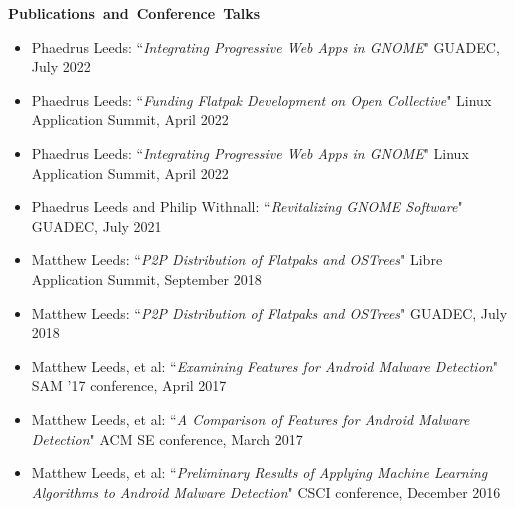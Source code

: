 \documentclass[11pt]{article}
\begin{document}
\newpage

\vspace{0.6em}
\hbox{\large \textbf{Publications and Conference Talks}}

\begin{itemize}[itemindent=0em]
  \item Phaedrus Leeds: ``\textit{Integrating Progressive Web Apps in GNOME}"\newline
        GUADEC, July 2022
  \item Phaedrus Leeds: ``\textit{Funding Flatpak Development on Open Collective}"\newline
        Linux Application Summit, April 2022
  \item Phaedrus Leeds: ``\textit{Integrating Progressive Web Apps in GNOME}"\newline
        Linux Application Summit, April 2022
  \item Phaedrus Leeds and Philip Withnall: ``\textit{Revitalizing GNOME Software}"\newline
        GUADEC, July 2021
  \item Matthew Leeds: ``\textit{P2P Distribution of Flatpaks and OSTrees}"\newline
        Libre Application Summit, September 2018
  \item Matthew Leeds: ``\textit{P2P Distribution of Flatpaks and OSTrees}"\newline
        GUADEC, July 2018
  \item Matthew Leeds, et al: ``\textit{Examining Features for Android Malware Detection}"\newline
        SAM '17 conference, April 2017
  \item Matthew Leeds, et al: ``\textit{A Comparison of Features for Android Malware Detection}"\newline
        ACM SE conference, March 2017
  \item Matthew Leeds, et al: ``\textit{Preliminary Results of Applying Machine Learning Algorithms to Android Malware Detection}"\newline
        CSCI conference, December 2016
\end{itemize}
\end{document}
